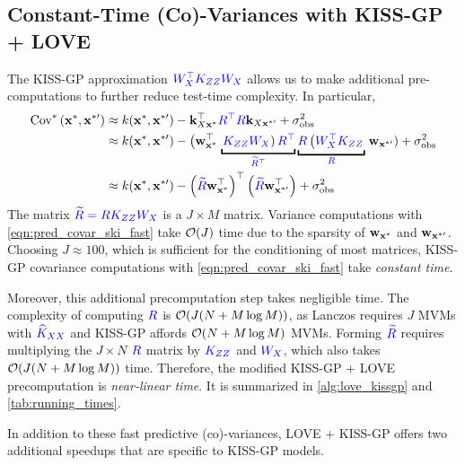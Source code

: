 \subsection{Constant-Time (Co)-Variances with KISS-GP + LOVE}
The KISS-GP approximation $\color{blue} W_{X}^\top K_{Z Z} W_{X}$ allows us to make additional pre-computations to further reduce test-time complexity.
In particular,
%
\begin{align}
  \covtest{\bxtest}{\bxtestprime}
  &\approx k(\bxtest, \bxtestprime) - \bk_{\bX \bxtest}^\top {\color{blue} \bR^\top \bR} \bk_{\bX \bxtestprime} + \sigma^2_\text{obs}
  \nonumber
  \\
  &\approx k(\bxtest, \bxtestprime) - \left( \bw^\top_{\bxtest} \right. \underbracket{\left. {\color{blue} \bK_{\bZ\bZ} \bW_\bX} \right) {\color{blue} \bR^\top}}_{\color{blue} \widetilde \bR^\top}
  \underbracket{{\color{blue} \bR} \left( {\color{blue} \bW_\bX^\top \bK_{\bZ\bZ}} \right.}_{\color{blue} \bR} \left. \bw_{\bxtestprime} \right) + \sigma^2_\text{obs}
  \nonumber
  \\
  &\approx k(\bxtest, \bxtestprime) -
  \left( {\color{blue} \widetilde \bR} \bw^\top_{\bxtest} \right)^\top
  \left( {\color{blue} \widetilde \bR} \bw^\top_{\bxtestprime} \right) + \sigma^2_\text{obs}
  \label{eqn:pred_covar_ski_fast}
\end{align}
%
The matrix $\color{blue} \widetilde {R} = R K_{ZZ} W_{X}$ is a $J \times M$ matrix.
Variance computations with \cref{eqn:pred_covar_ski_fast} take $\bigo{J}$ time due to the sparsity of $\mathbf{w}_{\mathbf{x}^*}$ and $\mathbf{w}_{\mathbf{x}^{*\prime}}$.
Choosing $J \approx 100$, which is sufficient for the conditioning of most matrices, KISS-GP covariance computations with \cref{eqn:pred_covar_ski_fast} take \emph{constant time}.

Moreover, this additional precomputation step takes negligible time.
The complexity of computing $\color{blue} R$ is $\bigo{J(N + M \log M)}$, as Lanczos requires $J$ MVMs with $\color{blue} \widehat{K}_{XX}$ and KISS-GP affords $\bigo{N + M \log M}$ MVMs.
Forming $\color{blue} \widetilde {R}$ requires multiplying the $J \! \times \! N$ $\color{blue} R$ matrix by $\color{blue} K_{ZZ}$ and $\color{blue} W_{X}$, which also takes $\bigo{J(N + M \log M)}$ time.
Therefore, the modified KISS-GP + LOVE precomputation is \emph{near-linear time}.
It is summarized in \cref{alg:love_kissgp} and \cref{tab:running_times}.

In addition to these fast predictive (co)-variances, LOVE + KISS-GP offers two additional speedups that are specific to KISS-GP models.





